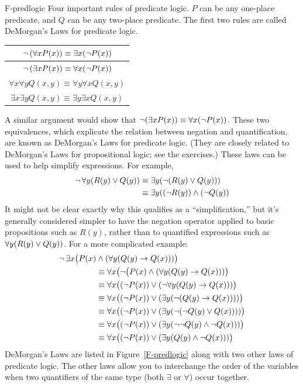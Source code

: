 \fig
  {F-predlogic}
  {Four important rules of predicate logic.  $P$ can be any one-place predicate,
   and $Q$ can be any two-place predicate.  The first two rules are called
   DeMorgan's Laws for predicate logic.}
  {\begin{tabular}{|c|}
     \hline
     \strut$\lnot\,(\forall x P(x)) \equiv \exists x(\lnot P(x))$\\
     \hline
     \strut$\lnot\,(\exists x P(x)) \equiv \forall x(\lnot P(x))$\\
     \hline
     \strut$\forall x \forall y Q(x,y) \equiv \forall y \forall x Q(x,y)$\\
     \hline
     \strut$\exists x \exists y Q(x,y) \equiv \exists y \exists x Q(x,y)$\\
     \hline
  \end{tabular}
 }

A similar argument would show that $\lnot(\exists x P(x)) \equiv \forall x(\lnot P(x))$.
These two equivalences, which explicate the relation between negation and quantification,
are known as DeMorgan's Laws for predicate logic.  (They are closely related to
DeMorgan's Laws for propositional logic; see the exercises.)  These
laws can be used to help simplify expressions.  For example, 
\begin{align*}
  \lnot\,\forall y (R(y)\vee Q(y)) &\equiv \exists y(\lnot(R(y)\vee Q(y)))\\
       &\equiv \exists y((\lnot R(y))\wedge(\lnot Q(y))\\
\end{align*}
It might not be clear exactly why this qualifies as a ``simplification,''
but it's generally considered simpler to have the negation operator applied
to basic propositions such as $R(y)$, rather than to quantified expressions
such as \hbox{$\forall y (R(y)\vee Q(y))$}.
For a more complicated example:
\begin{align*}
  \lnot\,\exists x\big(P(x)&\wedge (\forall y (Q(y)\rightarrow Q(x)))\big)\\
            &\equiv\forall x\big(\lnot\big(P(x)\wedge (\forall y (Q(y)\rightarrow Q(x)))\big)\\
            &\equiv\forall x\big((\lnot P(x))\vee (\lnot \forall y (Q(y)\rightarrow Q(x)))\big)\\
            &\equiv\forall x\big((\lnot P(x))\vee (\exists y(\lnot (Q(y)\rightarrow Q(x))))\big)\\
            &\equiv\forall x\big((\lnot P(x))\vee (\exists y(\lnot (\lnot Q(y)\vee Q(x))))\big)\\
            &\equiv\forall x\big((\lnot P(x))\vee (\exists y(\lnot\lnot Q(y)\wedge \lnot Q(x)))\big)\\
            &\equiv\forall x\big((\lnot P(x))\vee (\exists y(Q(y)\wedge \lnot Q(x)))\big)\\
\end{align*}
DeMorgan's Laws are listed in Figure~\ref{F-predlogic} along with two
other laws of predicate logic.  The other laws allow you to interchange
the order of the variables when two quantifiers of the same type
(both $\exists$ or $\forall$) occur together. 

